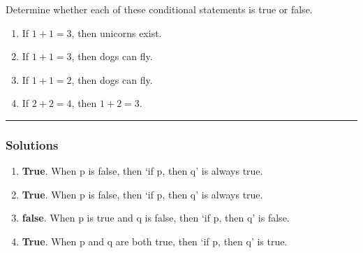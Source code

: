 \begin{question}
Determine whether each of these conditional statements is true or false.
\begin{enumerate}
\item If $1+1=3$, then unicorns exist.
\item If $1+1=3$, then dogs can fly.
\item If $1+1=2$, then dogs can fly.
\item If $2+2=4$, then $1+2=3$.
\end{enumerate}
\end{question}

\par\noindent\rule{\textwidth}{0.5pt}

\subsubsection*{Solutions}

\begin{enumerate}
\item \textbf{True}. When p is false, then `if p, then q' is always true.
\item \textbf{True}. When p is false, then `if p, then q' is always true.
\item \textbf{false}. When p is true and q is false, then `if p, then q' is false.
\item \textbf{True}. When p and q are both true, then `if p, then q' is true.

\end{enumerate}
